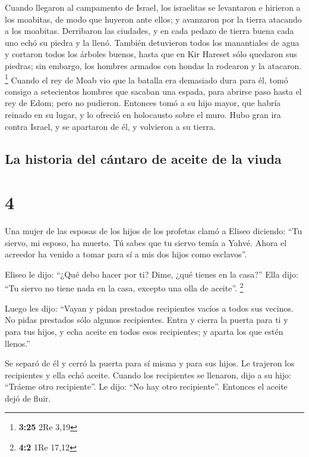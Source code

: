  Cuando llegaron al campamento de Israel, los israelitas
se levantaron e hirieron a los moabitas, de modo que huyeron ante ellos;
y avanzaron por la tierra atacando a los moabitas. 
Derribaron las ciudades, y en cada pedazo de tierra buena cada uno echó
su piedra y la llenó. También detuvieron todos los manantiales de agua y
cortaron todos los árboles buenos, hasta que en Kir Hareset sólo
quedaron sus piedras; sin embargo, los hombres armados con hondas la
rodearon y la atacaron. \footnote{\textbf{3:25} 2Re 3,19}
 Cuando el rey de Moab vio que la batalla era demasiado
dura para él, tomó consigo a setecientos hombres que sacaban una espada,
para abrirse paso hasta el rey de Edom; pero no pudieron.
 Entonces tomó a su hijo mayor, que habría reinado en su
lugar, y lo ofreció en holocausto sobre el muro. Hubo gran ira contra
Israel, y se apartaron de él, y volvieron a su tierra.

\hypertarget{la-historia-del-cuxe1ntaro-de-aceite-de-la-viuda}{%
\subsection{La historia del cántaro de aceite de la
viuda}\label{la-historia-del-cuxe1ntaro-de-aceite-de-la-viuda}}

\hypertarget{section-3}{%
\section{4}\label{section-3}}

 Una mujer de las esposas de los hijos de los profetas
clamó a Eliseo diciendo: ``Tu siervo, mi esposo, ha muerto. Tú sabes que
tu siervo temía a Yahvé. Ahora el acreedor ha venido a tomar para sí a
mis dos hijos como esclavos''.

 Eliseo le dijo: ``¿Qué debo hacer por ti? Dime, ¿qué
tienes en la casa?'' Ella dijo: ``Tu siervo no tiene nada en la casa,
excepto una olla de aceite''. \footnote{\textbf{4:2} 1Re 17,12}

 Luego les dijo: ``Vayan y pidan prestados recipientes
vacíos a todos sus vecinos. No pidas prestados sólo algunos recipientes.
 Entra y cierra la puerta para ti y para tus hijos, y echa
aceite en todos esos recipientes; y aparta los que estén llenos.''

 Se separó de él y cerró la puerta para sí misma y para
sus hijos. Le trajeron los recipientes y ella echó aceite.
 Cuando los recipientes se llenaron, dijo a su hijo:
``Tráeme otro recipiente''. Le dijo: ``No hay otro recipiente''.
Entonces el aceite dejó de fluir.

